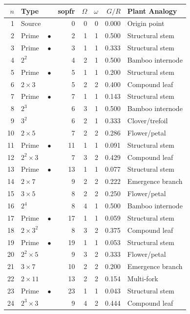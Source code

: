 \documentclass[11pt,a4paper]{article}
\begin{document}
\begin{table}[H]
\centering
\small
\begin{tabular}{rllrrrrl}
\toprule
$n$ & \textbf{Type} & & \textbf{sopfr} & $\Omega$ & $\omega$ & $G\!/\!R$ & \textbf{Plant Analogy} \\
\midrule
1 & Source & & 0 & 0 & 0 & 0.000 & Origin point \\
2 & Prime & $\bullet$ & 2 & 1 & 1 & 0.500 & Structural stem \\
3 & Prime & $\bullet$ & 3 & 1 & 1 & 0.333 & Structural stem \\
4 & $2^2$ & & 4 & 2 & 1 & 0.500 & Bamboo internode \\
5 & Prime & $\bullet$ & 5 & 1 & 1 & 0.200 & Structural stem \\
6 & $2\times3$ & & 5 & 2 & 2 & 0.400 & Compound leaf \\
7 & Prime & $\bullet$ & 7 & 1 & 1 & 0.143 & Structural stem \\
8 & $2^3$ & & 6 & 3 & 1 & 0.500 & Bamboo internode \\
9 & $3^2$ & & 6 & 2 & 1 & 0.333 & Clover/trefoil \\
10 & $2\times5$ & & 7 & 2 & 2 & 0.286 & Flower/petal \\
11 & Prime & $\bullet$ & 11 & 1 & 1 & 0.091 & Structural stem \\
12 & $2^2\times3$ & & 7 & 3 & 2 & 0.429 & Compound leaf \\
13 & Prime & $\bullet$ & 13 & 1 & 1 & 0.077 & Structural stem \\
14 & $2\times7$ & & 9 & 2 & 2 & 0.222 & Emergence branch \\
15 & $3\times5$ & & 8 & 2 & 2 & 0.250 & Flower/petal \\
16 & $2^4$ & & 8 & 4 & 1 & 0.500 & Bamboo internode \\
17 & Prime & $\bullet$ & 17 & 1 & 1 & 0.059 & Structural stem \\
18 & $2\times3^2$ & & 8 & 3 & 2 & 0.375 & Compound leaf \\
19 & Prime & $\bullet$ & 19 & 1 & 1 & 0.053 & Structural stem \\
20 & $2^2\times5$ & & 9 & 3 & 2 & 0.333 & Flower/petal \\
21 & $3\times7$ & & 10 & 2 & 2 & 0.200 & Emergence branch \\
22 & $2\times11$ & & 13 & 2 & 2 & 0.154 & Multi-fork \\
23 & Prime & $\bullet$ & 23 & 1 & 1 & 0.043 & Structural stem \\
24 & $2^3\times3$ & & 9 & 4 & 2 & 0.444 & Compound leaf \\

\end{tabular}
\end{table}
\end{document}
